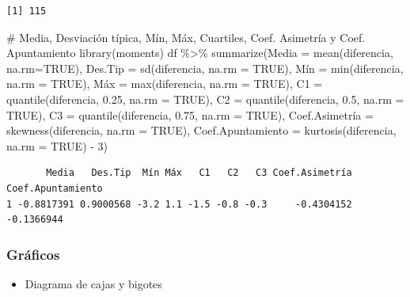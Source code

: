 \documentclass[
  a4paper,
]{scrreport}
\newenvironment{Shaded}{\begin{snugshade}}{\end{snugshade}}
\newcommand{\AttributeTok}[1]{\textcolor[rgb]{0.40,0.45,0.13}{#1}}
\newcommand{\CommentTok}[1]{\textcolor[rgb]{0.37,0.37,0.37}{#1}}
\newcommand{\ConstantTok}[1]{\textcolor[rgb]{0.56,0.35,0.01}{#1}}
\newcommand{\DecValTok}[1]{\textcolor[rgb]{0.68,0.00,0.00}{#1}}
\newcommand{\FloatTok}[1]{\textcolor[rgb]{0.68,0.00,0.00}{#1}}
\newcommand{\FunctionTok}[1]{\textcolor[rgb]{0.28,0.35,0.67}{#1}}
\newcommand{\NormalTok}[1]{\textcolor[rgb]{0.00,0.23,0.31}{#1}}
\newcommand{\OtherTok}[1]{\textcolor[rgb]{0.00,0.23,0.31}{#1}}
\newcommand{\SpecialCharTok}[1]{\textcolor[rgb]{0.37,0.37,0.37}{#1}}
\providecommand{\tightlist}{%
  \setlength{\itemsep}{0pt}\setlength{\parskip}{0pt}}\usepackage{longtable,booktabs,array}
\theoremstyle{definition}
\theoremstyle{definition}
\theoremstyle{remark}
\begin{document}
\begin{verbatim}
[1] 115
\end{verbatim}

\begin{Shaded}
\begin{Highlighting}[]
\CommentTok{\# Media, Desviación típica, Mín, Máx, Cuartiles, Coef. Asimetría y Coef. Apuntamiento}
\FunctionTok{library}\NormalTok{(moments)}
\NormalTok{df }\SpecialCharTok{\%\textgreater{}\%} \FunctionTok{summarize}\NormalTok{(}\AttributeTok{Media =} \FunctionTok{mean}\NormalTok{(diferencia, }\AttributeTok{na.rm=}\ConstantTok{TRUE}\NormalTok{), }\AttributeTok{Des.Tip =} \FunctionTok{sd}\NormalTok{(diferencia, }\AttributeTok{na.rm =} \ConstantTok{TRUE}\NormalTok{), Mín }\OtherTok{=} \FunctionTok{min}\NormalTok{(diferencia, }\AttributeTok{na.rm =} \ConstantTok{TRUE}\NormalTok{), Máx }\OtherTok{=} \FunctionTok{max}\NormalTok{(diferencia, }\AttributeTok{na.rm =} \ConstantTok{TRUE}\NormalTok{), }\AttributeTok{C1 =} \FunctionTok{quantile}\NormalTok{(diferencia, }\FloatTok{0.25}\NormalTok{, }\AttributeTok{na.rm =} \ConstantTok{TRUE}\NormalTok{), }\AttributeTok{C2 =} \FunctionTok{quantile}\NormalTok{(diferencia, }\FloatTok{0.5}\NormalTok{, }\AttributeTok{na.rm =} \ConstantTok{TRUE}\NormalTok{), }\AttributeTok{C3 =} \FunctionTok{quantile}\NormalTok{(diferencia, }\FloatTok{0.75}\NormalTok{, }\AttributeTok{na.rm =} \ConstantTok{TRUE}\NormalTok{), Coef.Asimetría }\OtherTok{=} \FunctionTok{skewness}\NormalTok{(diferencia, }\AttributeTok{na.rm =} \ConstantTok{TRUE}\NormalTok{), }\AttributeTok{Coef.Apuntamiento =} \FunctionTok{kurtosis}\NormalTok{(diferencia, }\AttributeTok{na.rm =} \ConstantTok{TRUE}\NormalTok{) }\SpecialCharTok{{-}} \DecValTok{3}\NormalTok{)}
\end{Highlighting}
\end{Shaded}

\begin{verbatim}
       Media   Des.Tip  Mín Máx   C1   C2   C3 Coef.Asimetría Coef.Apuntamiento
1 -0.8817391 0.9000568 -3.2 1.1 -1.5 -0.8 -0.3     -0.4304152        -0.1366944
\end{verbatim}

\subsubsection{Gráficos}\label{gruxe1ficos-3}

\begin{itemize}
\tightlist
\item
  Diagrama de cajas y bigotes
\end{itemize}
\end{document}
